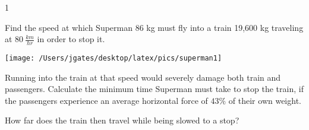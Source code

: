 
\AddToShipoutPicture*{\BackgroundPic}

\addtocounter {ProbNum} {1}

 
{\bf \Large{}} Find the speed at which Superman 86 kg must fly into a train 19,600 kg traveling at ${80~\tfrac{km}{hr}}$ in order to stop it.

\hspace{30 mm} \texttt{[image: /Users/jgates/desktop/latex/pics/superman1]} 

\vfill
Running into the train at that speed would severely damage both train and passengers. Calculate the minimum time Superman must take to stop the train, if the passengers experience an average horizontal force of $43\%$ of their own weight.

\vfill	
How far does the train then travel while being slowed to a stop?

\vfill
\newpage